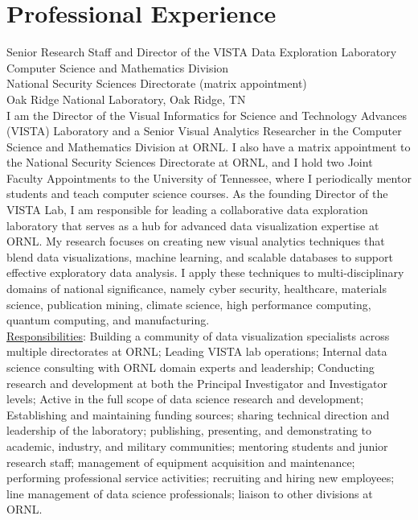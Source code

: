 \documentclass[11pt, letterpaper]{article}
\newcommand{\years}[1]{\marginnote{\scriptsize #1}}
\begin{document}
\section*{Professional Experience}
\noindent\years{2010--present}Senior Research Staff and Director of the VISTA Data Exploration Laboratory\\
Computer Science and Mathematics Division\\
National Security Sciences Directorate (matrix appointment)\\
Oak Ridge National Laboratory, Oak Ridge, TN\\[.2cm]
I am the Director of the Visual Informatics for Science and Technology Advances (VISTA) Laboratory and a Senior Visual Analytics Researcher in the Computer Science and Mathematics Division at ORNL. I also have a matrix appointment to the National Security Sciences Directorate at ORNL, and I hold two Joint Faculty Appointments to the University of Tennessee, where I periodically mentor students and teach computer science courses. As the founding Director of the VISTA Lab, I am responsible for leading a collaborative data exploration laboratory that serves as a hub for advanced data visualization expertise at ORNL. My research focuses on creating new visual analytics techniques that blend data visualizations, machine learning, and scalable databases to support effective exploratory data analysis. I apply these techniques to multi-disciplinary domains of national significance, namely cyber security, healthcare, materials science, publication mining, climate science, high performance computing, quantum computing, and manufacturing.\\
\underline{Responsibilities}: Building a community of data visualization specialists across multiple directorates at ORNL; Leading VISTA lab operations; Internal data science consulting with ORNL domain experts and leadership; Conducting research and development at both the Principal Investigator and Investigator levels; Active in the full scope of data science research and development; Establishing and maintaining funding sources; sharing technical direction and leadership of the laboratory; publishing, presenting, and demonstrating to academic, industry, and military communities; mentoring students and junior research staff; management of equipment acquisition and maintenance; performing professional service activities; recruiting and hiring new employees; line management of data science professionals; liaison to other divisions at ORNL.\\
\end{document}
